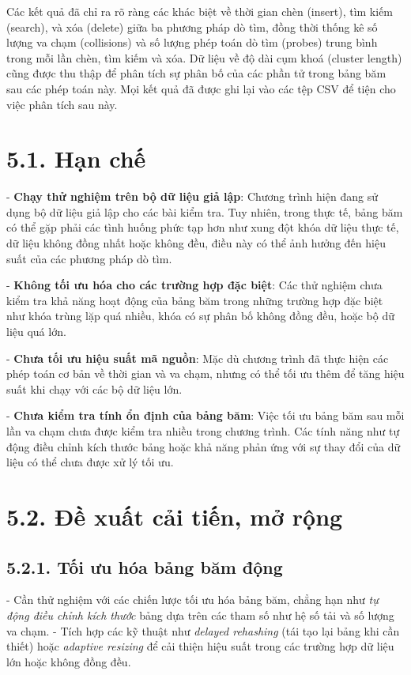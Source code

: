 \documentclass[12pt,a4paper]{report}
\begin{document}
Các kết quả đã chỉ ra rõ ràng các khác biệt về thời gian chèn (insert), tìm kiếm (search), và xóa (delete) giữa ba phương pháp dò tìm, đồng thời thống kê số lượng va chạm (collisions) và số lượng phép toán dò tìm (probes) trung bình trong mỗi lần chèn, tìm kiếm và xóa. Dữ liệu về độ dài cụm khoá (cluster length) cũng được thu thập để phân tích sự phân bố của các phần tử trong bảng băm sau các phép toán này. Mọi kết quả đã được ghi lại vào các tệp CSV để tiện cho việc phân tích sau này.
\section*{5.1. Hạn chế}
    \noindent \indent - \textbf{Chạy thử nghiệm trên bộ dữ liệu giả lập}: Chương trình hiện đang sử dụng bộ dữ liệu giả lập cho các bài kiểm tra. Tuy nhiên, trong thực tế, bảng băm có thể gặp phải các tình huống phức tạp hơn như xung đột khóa dữ liệu thực tế, dữ liệu không đồng nhất hoặc không đều, điều này có thể ảnh hưởng đến hiệu suất của các phương pháp dò tìm.
    
    - \textbf{Không tối ưu hóa cho các trường hợp đặc biệt}: Các thử nghiệm chưa kiểm tra khả năng hoạt động của bảng băm trong những trường hợp đặc biệt như khóa trùng lặp quá nhiều, khóa có sự phân bố không đồng đều, hoặc bộ dữ liệu quá lớn.
    
    - \textbf{Chưa tối ưu hiệu suất mã nguồn}: Mặc dù chương trình đã thực hiện các phép toán cơ bản về thời gian và va chạm, nhưng có thể tối ưu thêm để tăng hiệu suất khi chạy với các bộ dữ liệu lớn.
    
    - \textbf{Chưa kiểm tra tính ổn định của bảng băm}: Việc tối ưu bảng băm sau mỗi lần va chạm chưa được kiểm tra nhiều trong chương trình. Các tính năng như tự động điều chỉnh kích thước bảng hoặc khả năng phản ứng với sự thay đổi của dữ liệu có thể chưa được xử lý tối ưu.

\section*{5.2. Đề xuất cải tiến, mở rộng}
    \subsection*{5.2.1. Tối ưu hóa bảng băm động}
        - Cần thử nghiệm với các chiến lược tối ưu hóa bảng băm, chẳng hạn như \textit{tự động điều chỉnh kích thước} bảng dựa trên các tham số như hệ số tải và số lượng va chạm.
        - Tích hợp các kỹ thuật như \textit{delayed rehashing} (tái tạo lại bảng khi cần thiết) hoặc \textit{adaptive resizing} để cải thiện hiệu suất trong các trường hợp dữ liệu lớn hoặc không đồng đều.
    
\end{document}
